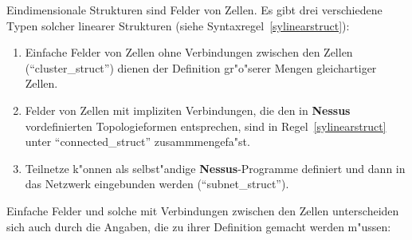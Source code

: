Eindimensionale Strukturen sind
Felder von Zellen. Es gibt drei verschiedene Typen solcher
linearer Strukturen (siehe Syntaxregel~\ref{sylinearstruct}):

\begin{enumerate}
  \item Einfache Felder von Zellen ohne
Verbindungen zwischen den Zellen (``cluster\_struct'')
dienen 
	der Definition gr"o"serer Mengen gleichartiger Zellen.
  \item Felder von Zellen mit impliziten
	Verbindungen, die den in {\bf
	Nessus} vordefinierten Topologieformen entsprechen, sind in
	Regel~\ref{sylinearstruct} unter ``connected\_struct'' zusammmengefa"st. 
  \item Teilnetze k"onnen als
	selbst"andige 
 	{\bf Nessus}-Programme definiert und dann in das 
	Netzwerk eingebunden werden (``subnet\_struct'').
\end{enumerate}

\begin{center}
\end{center}

Einfache Felder und solche mit Verbindungen
  zwischen den
Zellen unterscheiden sich auch durch die Angaben, die zu ihrer
Definition gemacht werden m"ussen:


